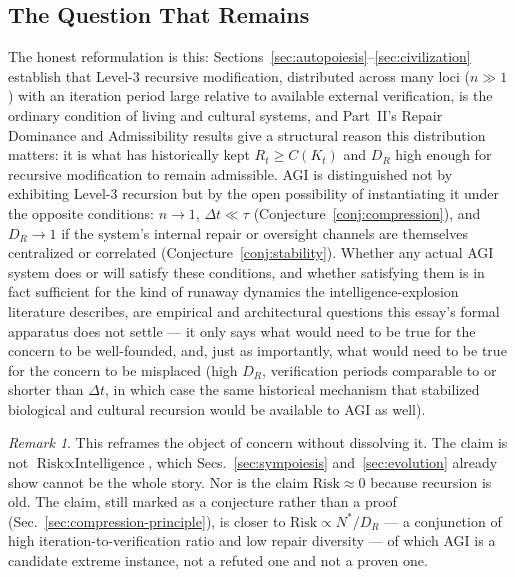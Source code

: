 \documentclass[11pt,a4paper]{article}
\theoremstyle{plain}
\theoremstyle{definition}
\theoremstyle{remark}
\newtheorem{remark}[theorem]{Remark}
\newcommand{\DR}{D_R}
\begin{document}
\subsection{The Question That Remains}
\label{subsec:remaining-question}

The honest reformulation is this: Sections~\ref{sec:autopoiesis}--\ref{sec:civilization} establish that Level-3 recursive modification, distributed across many loci ($n\gg1$) with an iteration period large relative to available external verification, is the ordinary condition of living and cultural systems, and Part~II's Repair Dominance and Admissibility results give a structural reason this distribution matters: it is what has historically kept $R_t \ge C(K_t)$ and $\DR$ high enough for recursive modification to remain admissible. AGI is distinguished not by exhibiting Level-3 recursion but by the open possibility of instantiating it under the opposite conditions: $n \to 1$, $\Delta t \ll \tau$ (Conjecture~\ref{conj:compression}), and $\DR \to 1$ if the system's internal repair or oversight channels are themselves centralized or correlated (Conjecture~\ref{conj:stability}). Whether any actual AGI system does or will satisfy these conditions, and whether satisfying them is in fact sufficient for the kind of runaway dynamics the intelligence-explosion literature describes, are empirical and architectural questions this essay's formal apparatus does not settle — it only says what would need to be true for the concern to be well-founded, and, just as importantly, what would need to be true for the concern to be misplaced (high $\DR$, verification periods comparable to or shorter than $\Delta t$, in which case the same historical mechanism that stabilized biological and cultural recursion would be available to AGI as well).

\begin{remark}
This reframes the object of concern without dissolving it. The claim is not $\text{Risk} \propto \text{Intelligence}$, which Secs.~\ref{sec:sympoiesis} and~\ref{sec:evolution} already show cannot be the whole story. Nor is the claim $\text{Risk} \approx 0$ because recursion is old. The claim, still marked as a conjecture rather than a proof (Sec.~\ref{sec:compression-principle}), is closer to $\text{Risk} \propto N^\ast / \DR$ — a conjunction of high iteration-to-verification ratio and low repair diversity — of which AGI is a candidate extreme instance, not a refuted one and not a proven one.
\end{remark}
\end{document}
